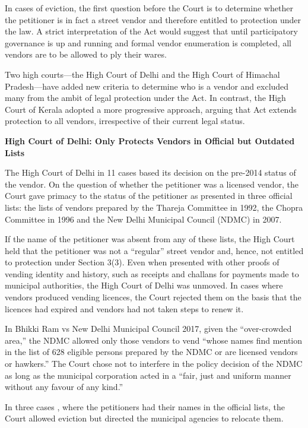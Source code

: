 \documentclass[a4paper, 12pt, twoside]{article}
\begin{document}
{In cases of eviction, the first question before the Court is to determine whether the petitioner is in fact a street vendor and therefore entitled to protection under the law. A strict interpretation of the Act would suggest that until participatory governance is up and running and formal vendor enumeration is completed, all vendors are to be allowed to ply their wares.

Two high courts—the High Court of Delhi and the High Court of Himachal Pradesh—have added new criteria to determine who is a vendor and excluded many from the ambit of legal protection under the Act. In contrast, the High Court of Kerala adopted a more progressive approach, arguing that Act extends protection to all vendors, irrespective of their current legal status.

\textbf{High Court of Delhi: Only Protects Vendors in Official but Outdated Lists}

The High Court of Delhi in 11 cases  based its decision on the pre-2014 status of the vendor. On the question of whether the petitioner was a licensed vendor, the Court gave primacy to the status of the petitioner as presented in three official lists: the lists of vendors prepared by the Thareja Committee in 1992, the Chopra Committee in 1996 and the New Delhi Municipal Council (NDMC) in 2007.

If the name of the petitioner was absent from any of these lists, the High Court held that the petitioner was not a “regular” street vendor and, hence, not entitled to protection under Section 3(3). Even when presented with other proofs of vending identity and history, such as receipts  and challans for payments made to municipal authorities, the High Court of Delhi was unmoved. In cases where vendors produced vending licences, the Court rejected them on the basis that the licences had expired and vendors had not taken steps to renew it.

In Bhikki Ram vs New Delhi Municipal Council 2017, given the “over-crowded area,” the NDMC allowed only those vendors to vend “whose names find mention in the list of 628 eligible persons prepared by the NDMC or are licensed vendors or hawkers.” The Court chose not to interfere in the policy decision of the NDMC as long as the municipal corporation acted in a “fair, just and uniform manner without any favour of any kind.”

In three cases , where the petitioners had their names in the official lists, the Court allowed eviction but directed the municipal agencies to relocate them.

}
\end{document}
